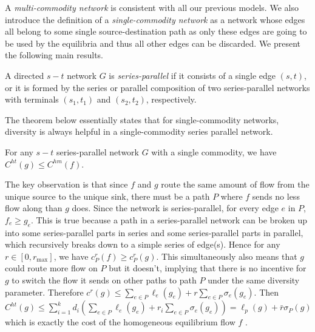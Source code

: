 A {\it multi-commodity network} is consistent with all our previous models. We also introduce the definition of a {\it single-commodity network} as a network whose edges all belong to some single source-destination path as only these edges are going to be used by the equilibria and thus all other edges can be discarded. We present the following main results.

\begin{definition}
A directed $s-t$ network $G$ is {\it series-parallel} if it consists of a single edge $(s, t)$, or it is formed by the series or parallel composition of two series-parallel networks with terminals $(s_1, t_1)$ and $(s_2, t_2)$, respectively.
\end{definition}

The theorem below essentially states that for single-commodity networks, diversity is always helpful in a single-commodity series parallel network.

\begin{theorem}
For any $s-t$ series-parallel network $G$ with a single commodity, we have $C^{ht}(g)\le C^{hm}(f)$.
\label{diverse1}
\end{theorem}

\begin{proof-sketch}

    The key observation is that since $f$ and $g$ route the same amount of flow from the unique source to the unique sink, there must be a path $P$ where $f$ sends no less flow along than $g$ does.  Since the network is series-parallel, for every edge $e$ in $P$, $f_e \ge g_e$. This is true because a path in a series-parallel network can be broken up into some series-parallel parts in series and some series-parallel parts in parallel, which recursively breaks down to a simple series of edge(s). Hence for any $r\in [0, r_{\max}]$, we have $c_P^r(f)\ge c_P^r(g)$. This simultaneously also means that $g$ could route more flow on $P$ but it doesn't, implying that there is no incentive for $g$ to switch the flow it sends on other paths to path $P$ under the same diversity parameter. Therefore  $c^r(g)\le \sum_{e\in P} \ell_e(g_e)+r\sum_{e\in P}\sigma_e(g_e)$. Then $C^{ht}(g)\le \sum_{i=1}^k d_i(\sum_{e\in P} \ell_e(g_e)+r_i\sum_{e\in P}\sigma_e(g_e))=\ell_p(g)+\bar{r}\sigma_P(g)$ which is exactly the cost of the homogeneous equilibrium flow $f$ .
\end{proof-sketch}


